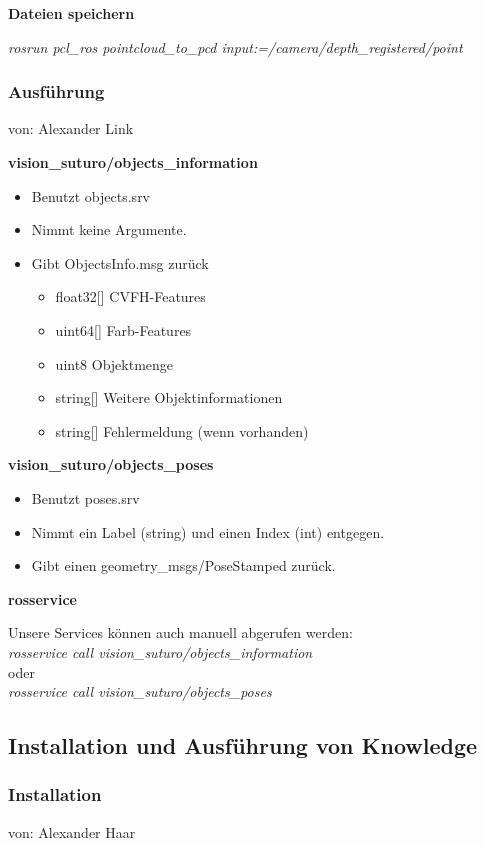 \documentclass{suturo}
\makeatletter
\newcommand{\chapterauthor}[1]{%
  {\parindent0pt\vspace*{-27pt}%
  \linespread{0}\small\begin{flushright}von: #1\end{flushright}%
  \par\nobreak\vspace*{0pt}}
  \@afterheading%
}
\makeatother
\begin{document}
\textbf{Dateien speichern}

    \textit{rosrun pcl\_ros pointcloud\_to\_pcd input:=/camera/depth\_registered/point}


\subsubsection{Ausf\"uhrung}
\chapterauthor{Alexander Link}

\textbf{vision\_suturo/objects\_information}
\begin{itemize}
\item Benutzt objects.srv
\item Nimmt keine Argumente.
\item Gibt ObjectsInfo.msg zurück
\begin{itemize}
\item float32[] CVFH-Features
\item uint64[] Farb-Features
\item uint8 Objektmenge
\item string[] Weitere Objektinformationen
\item string[] Fehlermeldung (wenn vorhanden)
\end{itemize}
\end{itemize}
\textbf{vision\_suturo/objects\_poses}
\begin{itemize}
\item Benutzt poses.srv
\item Nimmt ein Label (string) und einen Index (int) entgegen.
\item Gibt einen geometry\_msgs/PoseStamped zurück.
\end{itemize}

\textbf{rosservice}

Unsere Services k\"onnen auch manuell abgerufen werden: \\

\textit{rosservice call vision\_suturo/objects\_information} \\

oder \\

\textit{rosservice call vision\_suturo/objects\_poses}

\subsection{Installation und Ausführung von Knowledge}

\subsubsection{Installation}
\chapterauthor{Alexander Haar}
\end{document}
